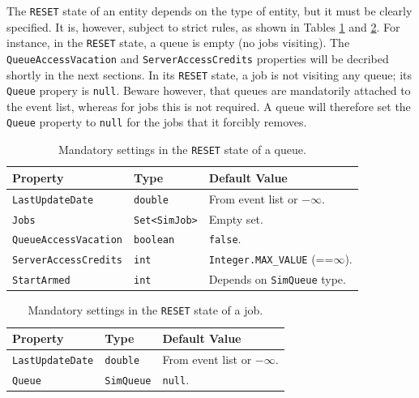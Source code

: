 The \lstinline-RESET- state of an entity depends
on the type of entity,
but it must be clearly specified.
It is, however, subject to strict rules,
as shown in Tables
\ref{resetStateSettings-queue}
and
\ref{resetStateSettings-job}.
For instance,
in the \lstinline|RESET| state,
a queue is empty (no jobs visiting).
The \lstinline|QueueAccessVacation| and
\lstinline|ServerAccessCredits|
properties will be decribed shortly
in the next sections.
In its \lstinline|RESET| state,
a job is not visiting any queue;
its \lstinline|Queue| propery is \lstinline|null|.
Beware however,
that queues are mandatorily attached to the event list,
whereas for jobs this is not required.
A queue will therefore set
the \lstinline|Queue| property to \lstinline|null|
for the jobs that it forcibly removes.

\begin{table}[h]
	\caption{Mandatory settings in the \texttt{RESET} state
		of a queue.}
	\label{resetStateSettings-queue}
	\begin{center}
		\begin{tabular}{|l|l|l|}
			\hline
			Property & Type & Default Value \\ \hline
			\lstinline|LastUpdateDate|      & \lstinline|double|      & From event list or $-\infty$.               \\ \hline
			\lstinline|Jobs|                & \lstinline|Set<SimJob>| & Empty set.                                  \\ \hline
			\lstinline|QueueAccessVacation| & \lstinline|boolean|     & \lstinline|false|.                          \\ \hline
			\lstinline|ServerAccessCredits| & \lstinline|int|         & \lstinline|Integer.MAX_VALUE| (==$\infty$). \\ \hline
			\lstinline|StartArmed|          & \lstinline|int|         & Depends on \lstinline|SimQueue| type.       \\ \hline
		\end{tabular}
	\end{center}
\end{table}

\begin{table}[h]
	\caption{Mandatory settings in the \texttt{RESET} state
		of a job.}
	\label{resetStateSettings-job}
	\begin{center}
		\begin{tabular}{|l|l|l|}
			\hline
			Property & Type & Default Value \\ \hline
			\lstinline|LastUpdateDate|      & \lstinline|double|      & From event list or $-\infty$.               \\ \hline
			\lstinline|Queue|               & \lstinline|SimQueue|    & \lstinline|null|.                           \\ \hline
		\end{tabular}
	\end{center}
\end{table}

